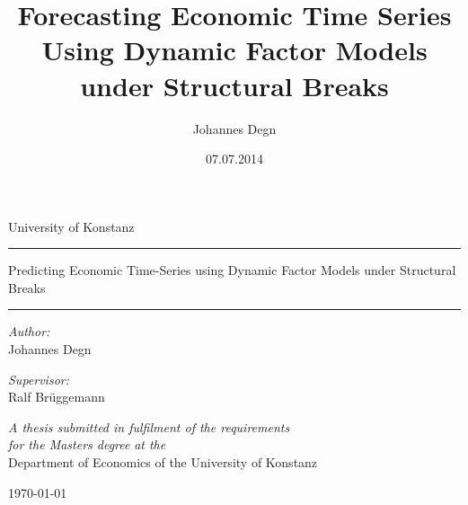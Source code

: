 \documentclass[12pt]{article}
\title{\textbf{Forecasting Economic Time Series Using Dynamic Factor Models under Structural Breaks}}
\author{Johannes Degn}
\date{07.07.2014}
\newcommand{\HRule}{\rule{\linewidth}{0.5mm}}
\begin{document}
\titlepage
\thispagestyle{empty}
\setcounter{page}{0}

\begin{titlepage}
\begin{center}
	University of Konstanz

	\vspace{2cm}
	\HRule
	\vspace{1cm}
	\large{Predicting Economic Time-Series using Dynamic Factor Models under Structural Breaks}
	\vspace{1cm}
	\HRule
    \vspace{1cm}
    
	\begin{minipage}{0.4\textwidth}
		\begin{flushleft}
			\emph{Author:} \\
			Johannes Degn
		\end{flushleft}
	\end{minipage}
	\begin{minipage}{0.4\textwidth}
		\begin{flushright}
			\emph{Supervisor:} \\
			Ralf Brüggemann
		\end{flushright}
	\end{minipage}
    \vspace{8cm}
	 
	\textit{A thesis submitted in fulfilment of the requirements\\ for the Masters degree}
	\textit{at the}\\[0.4cm]
	Department of Economics of the University of Konstanz
	 
	{\large \today}\\[4cm]
	 
	\vfill


\end{center}
\end{titlepage}



\newpage







\newpage
\tableofcontents
\newpage

\cleardoublepage
{}
\listoffigures
\cleardoublepage
{}
\listoftables
\newpage



\end{document}
